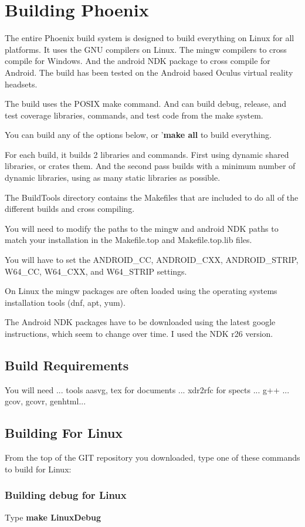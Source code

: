 \section{Building Phoenix}
The entire Phoenix build system is designed to build everything
on Linux for all platforms.
It uses the GNU compilers on Linux.
The mingw compilers to cross compile for Windows.
And the android NDK package to cross compile for Android.
The build has been tested on the Android based Oculus virtual
reality headsets.

The build uses the POSIX make command.
And can build debug, release, and test coverage libraries,
commands, and test code from the make system.

You can build any of the options below, or '\textbf{make all}
to build everything.

For each build, it builds 2 libraries and commands.
First using dynamic shared libraries, or crates them.
And the second pass builds with a minimum number
of dynamic libraries, using as many static libraries
as possible.

The BuildTools directory contains the Makefiles
that are included to do all of the different builds
and cross compiling.

You will need to modify the paths to the mingw and
android NDK paths to match your installation in the
Makefile.top and Makefile.top.lib files.

You will have to set the ANDROID\_CC, ANDROID\_CXX, ANDROID\_STRIP,
W64\_CC, W64\_CXX, and W64\_STRIP settings.

On Linux the mingw packages are often loaded using the operating
systems installation tools (dnf, apt, yum).

The Android NDK packages have to be downloaded using the
latest google instructions, which seem to change over time.
I used the NDK r26 version.

\subsection{Build Requirements}
You will need ... tools aasvg,
tex for documents ...
xdr2rfc for spects ...
g++ ...
gcov, gcovr, genhtml...
\subsection{Building For Linux}
From the top of the GIT repository you downloaded,
type one of these commands to build for Linux:

\subsubsection{Building debug for Linux}
Type \textbf{make LinuxDebug}


